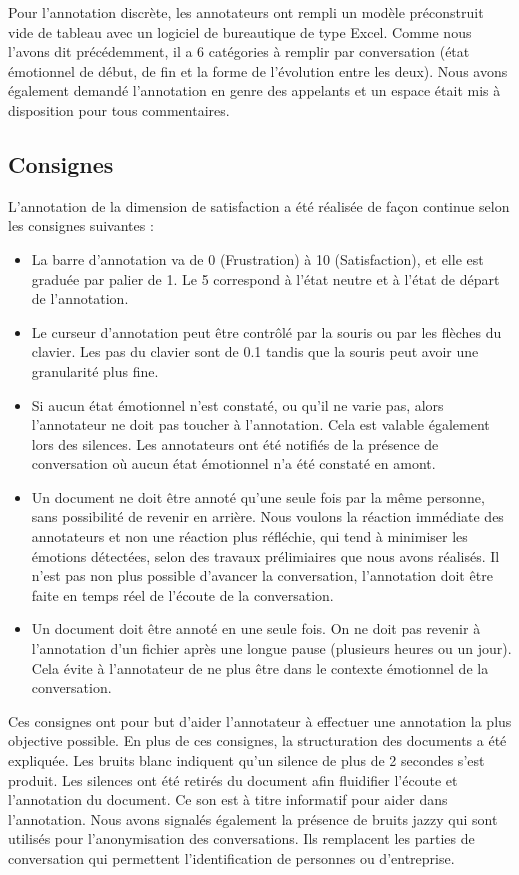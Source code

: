 Pour l'annotation discrète, les annotateurs ont rempli un modèle préconstruit vide de tableau avec un logiciel de bureautique de type Excel. Comme nous l'avons dit précédemment, il a 6 catégories à remplir par conversation (état émotionnel de début, de fin et la forme de l'évolution entre les deux). Nous avons également demandé l'annotation en genre des appelants et un espace était mis à disposition pour tous commentaires.

\subsection{Consignes}

L'annotation de la dimension de satisfaction a été réalisée de façon continue selon les consignes suivantes :
\begin{itemize}
  \item La barre d'annotation va de 0 (Frustration) à 10 (Satisfaction), et elle est graduée par palier de 1. Le 5 correspond à l'état neutre et à l'état de départ de l'annotation.
  \item Le curseur d'annotation peut être contrôlé par la souris ou par les flèches du clavier. Les pas du clavier sont de 0.1 tandis que la souris peut avoir une granularité plus fine.
  \item Si aucun état émotionnel n'est constaté, ou qu'il ne varie pas, alors l'annotateur ne doit pas toucher à l'annotation. Cela est valable également lors des silences. Les annotateurs ont été notifiés de la présence de conversation où aucun état émotionnel n'a été constaté en amont.
  \item Un document ne doit être annoté qu'une seule fois par la même personne, sans possibilité de revenir en arrière. Nous voulons la réaction immédiate des annotateurs et non une réaction plus réfléchie, qui tend à minimiser les émotions détectées, selon des travaux prélimiaires que nous avons réalisés. Il n'est pas non plus possible d'avancer la conversation, l'annotation doit être faite en temps réel de l'écoute de la conversation.
  \item Un document doit être annoté en une seule fois. On ne doit pas revenir à l'annotation d'un fichier après une longue pause (plusieurs heures ou un jour). Cela évite à l'annotateur de ne plus être dans le contexte émotionnel de la conversation.
\end{itemize}

Ces consignes ont pour but d'aider l'annotateur à effectuer une annotation la plus objective possible. En plus de ces consignes, la structuration des documents a été expliquée. Les bruits blanc indiquent qu'un silence de plus de 2 secondes s'est produit. Les silences ont été retirés du document afin fluidifier l'écoute et l'annotation du document. Ce son est à titre informatif pour aider dans l'annotation. Nous avons signalés également la présence de bruits jazzy qui sont utilisés pour l'anonymisation des conversations. Ils remplacent les parties de conversation qui permettent l'identification de personnes ou d'entreprise.

